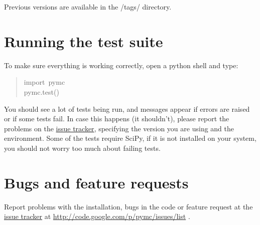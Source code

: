 Previous versions are available in the /tags/ directory.



\hypertarget{running-the-test-suite}{}
\section*{Running the test suite}
\label{running-the-test-suite}

To make sure everything is working correctly, open a python shell and type:
\begin{quote}{\ttfamily \raggedright \noindent
import~pymc~\\
pymc.test()
}\end{quote}

You should see a lot of tests being run, and messages appear if errors are
raised or if some tests fail. In case this happens (it shouldn't), please report
the problems on the \href{http://code.google.com/p/pymc/issues/list.}{issue tracker}, specifying the version you are using and the
environment. Some of the tests require SciPy, if it is not installed on your
system, you should not worry too much about failing tests.



\hypertarget{bugs-and-feature-requests}{}
\section*{Bugs and feature requests}
\label{bugs-and-feature-requests}

Report problems with the installation, bugs in the code or feature request at
the \href{http://code.google.com/p/pymc/issues/list.}{issue tracker} at \href{http://code.google.com/p/pymc/issues/list}{http://code.google.com/p/pymc/issues/list} .

\